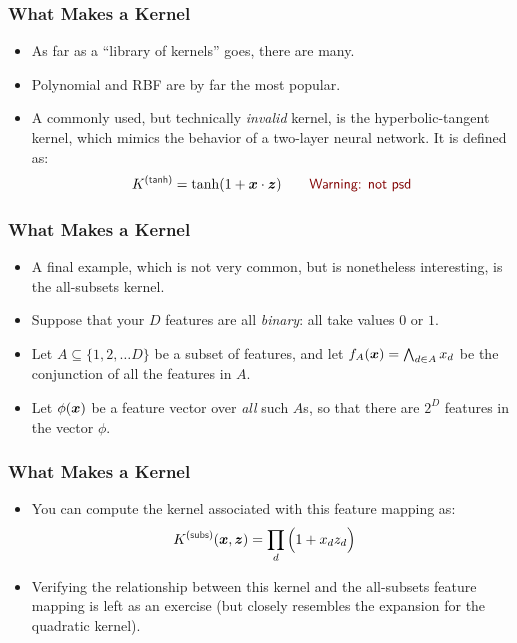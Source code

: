 \documentclass[trans]{beamer}
\begin{document}
\begin{frame}
  \frametitle{What Makes a Kernel}
\begin{itemize}
\item 
As far as a ``library of kernels'' goes, there are many.  
\item Polynomial
and RBF are by far the most popular. 
\item A commonly used, but technically
\emph{invalid} kernel, is the hyperbolic-tangent kernel, which mimics
the behavior of a two-layer neural network.  It is defined as:
%
\begin{align}
K\xth{tanh} &= \tanh(1 + \dotp{\vx}{\vz})
\becauseof{Warning: not psd}
\end{align}
\end{itemize}
\end{frame}

\begin{frame}
  \frametitle{What Makes a Kernel}
\begin{itemize}
\item 
A final example, which is not very common, but is nonetheless
interesting, is the all-subsets kernel. 
\item Suppose that your $D$
features are all \emph{binary}: all take values $0$ or $1$.  
\item Let $A
\subseteq \{ 1, 2, \dots D \}$ be a subset of features, and let
$f_A({\boldsymbol{x}}) = \bigwedge_{d \in A} x_d$ be the conjunction of all the
features in $A$.  
\item Let $\phi({\boldsymbol{x}})$ be a feature vector over \emph{all}
such $A$s, so that there are $2^D$ features in the vector $\phi$.  
\end{itemize}
\end{frame}

\begin{frame}
  \frametitle{What Makes a Kernel}
\begin{itemize}
\item 
You
can compute the kernel associated with this feature mapping as:
%
\begin{align}
K\xth{subs}(\vx,\vz) &= \prod_d \Big( 1 + x_d z_d \Big)
\end{align}
%
\item Verifying the relationship between this kernel and the all-subsets
feature mapping is left as an exercise (but closely resembles the
expansion for the quadratic kernel).
\end{itemize}
\end{frame}
\end{document}
